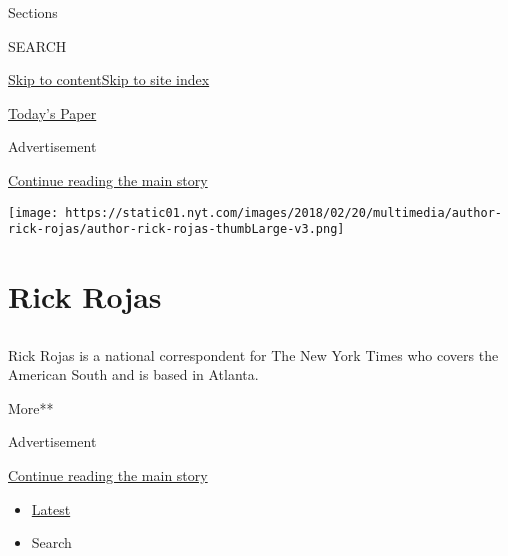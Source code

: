 Sections

SEARCH

\protect\hyperlink{site-content}{Skip to
content}\protect\hyperlink{site-index}{Skip to site index}

\href{https://myaccount.nytimes.com/auth/login?response_type=cookie\&client_id=vi}{}

\href{https://www.nytimes.com/section/todayspaper}{Today's Paper}

Advertisement

\protect\hyperlink{after-top}{Continue reading the main story}

\texttt{[image: https://static01.nyt.com/images/2018/02/20/multimedia/author-rick-rojas/author-rick-rojas-thumbLarge-v3.png]}

\hypertarget{rick-rojas}{%
\section{Rick Rojas}\label{rick-rojas}}

\subsection{}

Rick Rojas is a national correspondent for The New York Times who covers
the American South and is based in Atlanta.

More**

Advertisement

\protect\hyperlink{after-mid1}{Continue reading the main story}

\begin{itemize}
\tightlist
\item
  \protect\hyperlink{stream-panel}{Latest}
\item
  Search
\end{itemize}

